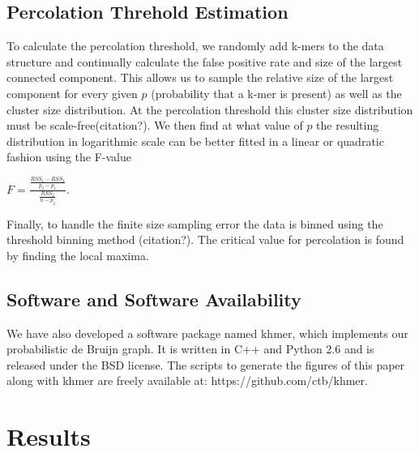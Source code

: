 \documentclass[12pt]{article} \usepackage{simplemargins}
\begin{document}
\subsection{Percolation Threhold Estimation}
To calculate the percolation threshold, we randomly add k-mers to the data structure 
and continually calculate the false positive rate and size of the largest connected 
component. This allows us to sample the relative size of the largest component for every 
given $p$ (probability that a k-mer is present) as well as the cluster size distribution. 
At the percolation threshold this cluster size distribution must be scale-free(citation?). 
We then find at what value of $p$ the resulting 
distribution in logarithmic 
scale can be better fitted in a linear or quadratic fashion using 
the F-value
\newline
\newline
{}
\begin{center}
$F=\frac{\frac{RSS_1-RSS_2}{p_2-p_1}}{\frac{RSS_2}{n-p_2}}$.
\end{center}
Finally, to handle the finite size sampling error the data is binned using the 
threshold binning method (citation?). The critical value for percolation is found 
by finding the local maxima.

\subsection{Software and Software Availability}

We have also developed a software package named khmer, which
implements our probabilistic de Bruijn graph.  It is written in C++
and Python 2.6 and is released under the BSD license. The scripts to 
generate the figures of this paper along with khmer are freely available
at: https://github.com/ctb/khmer.

\section{Results}
\end{document}
